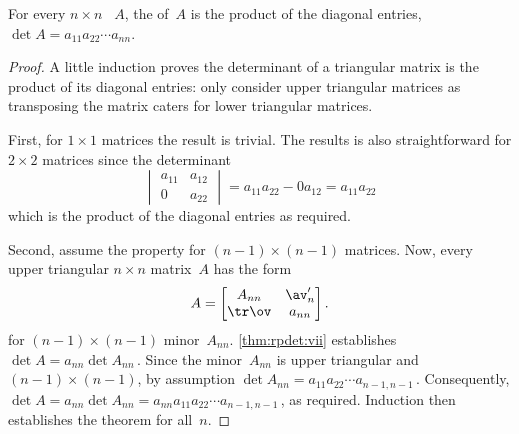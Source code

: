 \begin{theorem}\label{thm:rpdet:vi} 
For every \(n\times n\) ~\(A\),
the  of~\(A\) is the product of the diagonal entries, \(\det A=a_{11}a_{22}\cdots a_{nn}\).
\end{theorem}
\begin{proof} 
A little induction proves the determinant of a triangular matrix is the product of its diagonal entries: only consider upper triangular matrices as transposing the matrix caters for lower triangular matrices.

First, for \(1\times 1\) matrices the result is trivial.
The results is also straightforward for \(2\times 2\) matrices since the determinant
\begin{equation*}
\begin{vmatrix} a_{11}&a_{12}\\0&a_{22} \end{vmatrix}
=a_{11}a_{22}-0a_{12}=a_{11}a_{22}
\end{equation*}
which is the product of the diagonal entries as required.

Second, assume the property for \((n-1)\times(n-1)\) matrices.
Now, every upper triangular \(n\times n\) matrix~\(A\) has the form
\begin{equation*}
A=\begin{bmatrix} A_{nn}&\av_n'\\\tr\ov&a_{nn} \end{bmatrix}.
\end{equation*}
for \((n-1)\times(n-1)\) minor~\(A_{nn}\).
\autoref{thm:rpdet:vii} establishes \(\det A=a_{nn}\det A_{nn}\)\,.  
Since the  minor~\(A_{nn}\) is upper triangular and \((n-1)\times(n-1)\), by assumption \(\det A_{nn}=a_{11}a_{22}\cdots a_{n-1,n-1}\)\,.
Consequently, \(\det A=a_{nn}\det A_{nn}=a_{nn}a_{11}a_{22}\cdots a_{n-1,n-1}\)\,, as required.
Induction then establishes the theorem for all~\(n\).
\end{proof}





